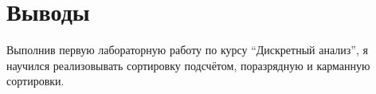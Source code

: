 \section{Выводы}

Выполнив первую лабораторную работу по курсу \enquote{Дискретный анализ}, я научился реализовывать сортировку подсчётом, поразрядную и карманную сортировки.
\pagebreak
